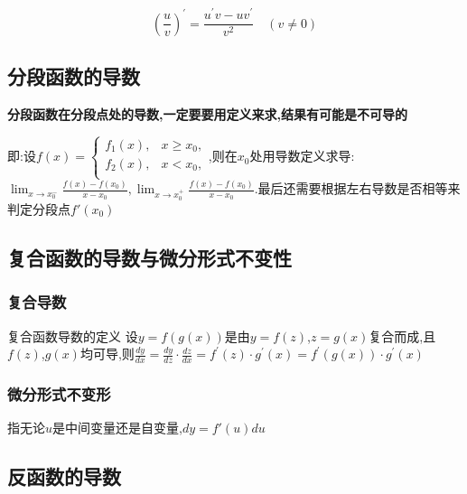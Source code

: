 \documentclass[12pt, a4paper, oneside, UTF8]{ctexbook}  %
\begin{document}
$$
    \left(\frac uv\right)^{\prime}=\frac{u^{\prime}v-uv^{\prime}}{v^2}\quad(v\neq0)
$$

\subsection{分段函数的导数}
\textbf{分段函数在分段点处的导数,一定要要用定义来求,结果有可能是不可导的}

即:设$f(x)=\begin{cases}f_1(x),&x\geqslant x_0,\\f_2(x),&x<x_0,\\\end{cases}$,则在$x_0$处用导数定义求导:$\lim _ { x \rightarrow x _ { 0 }^{-} } \frac { f ( x ) - f ( x _ { 0 } ) } { x - x _ { 0 } }, \lim _ { x \rightarrow x_0^+ } \frac { f ( x ) - f ( x _0)  } { x - x _ { 0 } }$.最后还需要根据左右导数是否相等来判定分段点$f'(x_0)$

\subsection{复合函数的导数与微分形式不变性}
\subsubsection{复合导数}
\begin{defn}{复合函数导数的定义}{}
    设$y = f ( g ( x ) )$是由$y=f(z)$,$z=g(x)$复合而成,且$f(z)$,$g(x)$均可导,则$\frac { d y } { d x } = \frac { d y } { d z } \cdot \frac { d z } { d x } = f ^ { \prime } ( z ) \cdot g ^ { \prime } ( x ) = f ^ { \prime } ( g ( x )) \cdot g ^ { \prime } ( x )$
\end{defn}
\subsubsection{微分形式不变形}
指无论$u$是中间变量还是自变量,$dy=f'(u)du$
\subsection{反函数的导数}
\end{document}
